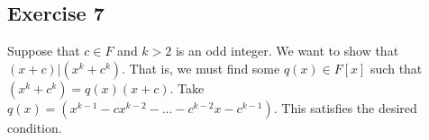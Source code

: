 \subsection*{Exercise 7}
Suppose that $c \in F$ and $k > 2$ is an odd integer. We want to show that $(x + c) \vert (x^k + c^k)$. That is, we must find some $q(x) \in F[x]$ such that $(x^k + c^k) = q(x)(x+c)$. Take $q(x) = (x^{k-1} - cx^{k-2} - ... - c^{k-2}x - c^{k-1})$. This satisfies the desired condition.